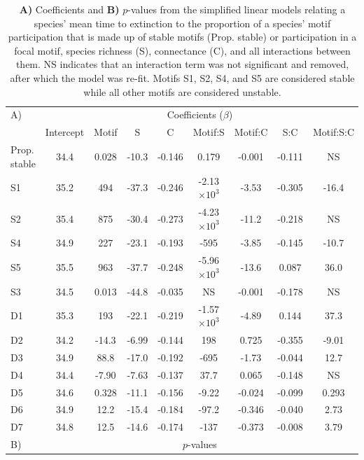 \documentclass[12pt]{article}
\begin{document}
	\begin{table}[h!]
		\caption{\textbf{A)} Coefficients and \textbf{B)} $p$-values from the simplified linear models relating a species' mean time to extinction to the proportion of a species' motif participation that is made up of stable motifs (Prop. stable) or participation in a focal motif, species richness (S), connectance (C), and all interactions between them. NS indicates that an interaction term was not significant and removed, after which the model was re-fit. Motifs S1, S2, S4, and S5 are considered stable while all other motifs are considered unstable.}
		\label{motif_lmers}
		\begin{tabular}{m{1.5cm} | c c  c c  c c  c c |}	
		A) & \multicolumn{8}{c|}{Coefficients ($\beta$)} \\
		&	Intercept	&	Motif	& S	& C	&	Motif:S	&	Motif:C	&	S:C	&	Motif:S:C \\
		\hline
		Prop. stable	&	34.4	&	0.028	&	-10.3	&	-0.146	&	0.179	&	-0.001	&	-0.111	&	NS	\\
		\hline
		S1	&	35.2	&	494	&	-37.3	&	-0.246	&	-2.13$\times10^{3}$	&	-3.53	&	-0.305	&	-16.4	\\
		S2	&	35.4	&	875	&	-30.4	&	-0.273	&	-4.23$\times10^{3}$	&	-11.2	&	-0.218	&	NS	\\
		S4	&	34.9	&	227	&	-23.1	&	-0.193	&	-595	&	-3.85	&	-0.145	&	-10.7	\\
		S5	&	35.5	&	963	&	-37.7	&	-0.248	&	-5.96$\times10^{3}$	&	-13.6	&	0.087	&	36.0	\\
			\hline
		S3	&	34.5	&	0.013	&	-44.8	&	-0.035	&	NS	&	-0.001	&	-0.178	&	NS	\\
		D1	&	35.3	&	193	&	-22.1	&	-0.219	&	-1.57$\times10^{3}$	&	-4.89	&	0.144	&	37.3	\\
		D2	&	34.2	&	-14.3	&	-6.99	&	-0.144	&	198	&	0.725	&	-0.355	&	-9.01	\\
		D3	&	34.9	&	88.8	&	-17.0	&	-0.192	&	-695	&	-1.73	&	-0.044	&	12.7	\\
		D4	&	34.4	&	-7.90	&	-7.63	&	-0.137	&	37.7	&	0.065	&	-0.148	&	NS	\\
		D5	&	34.6	&	0.328	&	-11.1	&	-0.156	&	-9.22	&	-0.024	&	-0.099	&	0.293	\\
		D6	&	34.9	&	12.2	&	-15.4	&	-0.184	&	-97.2	&	-0.346	&	-0.040	&	2.73	\\
		D7	&	34.8	&	12.5	&	-14.6	&	-0.174	&	-137	&	-0.373	&	-0.008	&	3.79	\\
		\hline
		B) & \multicolumn{8}{c|}{$p$-values} \\

\end{tabular}
\end{table}
\end{document}
